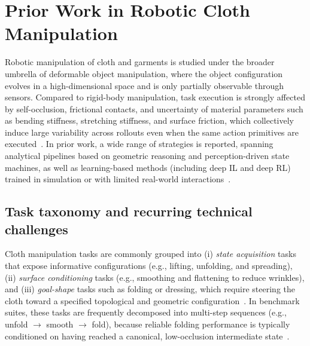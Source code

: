 
\section{Prior Work in Robotic Cloth Manipulation}
\label{sec:prior_work}

Robotic manipulation of cloth and garments is studied under the broader umbrella of deformable object manipulation, where the object configuration evolves in a high-dimensional space and is only partially observable through sensors. Compared to rigid-body manipulation, task execution is strongly affected by self-occlusion, frictional contacts, and uncertainty of material parameters such as bending stiffness, stretching stiffness, and surface friction, which collectively induce large variability across rollouts even when the same action primitives are executed~\cite{Sanchez2018DeformableSurvey,Gu2023DeformableSurvey,Longhini2025ClothReview}. In prior work, a wide range of strategies is reported, spanning analytical pipelines based on geometric reasoning and perception-driven state machines, as well as learning-based methods (including deep \ac{IL} and deep \ac{RL}) trained in simulation or with limited real-world interactions~\cite{Longhini2025ClothReview}.

\subsection{Task taxonomy and recurring technical challenges}

Cloth manipulation tasks are commonly grouped into (i) \emph{state acquisition} tasks that expose informative configurations (e.g., lifting, unfolding, and spreading), (ii) \emph{surface conditioning} tasks (e.g., smoothing and flattening to reduce wrinkles), and (iii) \emph{goal-shape} tasks such as folding or dressing, which require steering the cloth toward a specified topological and geometric configuration~\cite{GarciaCamacho2020ClothBenchmark,Longhini2025ClothReview}. In benchmark suites, these tasks are frequently decomposed into multi-step sequences (e.g., unfold $\rightarrow$ smooth $\rightarrow$ fold), because reliable folding performance is typically conditioned on having reached a canonical, low-occlusion intermediate state~\cite{Longhini2025ClothReview,Ha2021FlingBot,Canberk2022ClothFunnels}.


